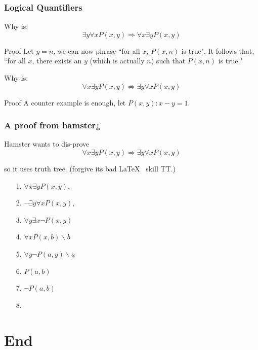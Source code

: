 \documentclass[xcolor=table]{beamer}
\begin{document}
\begin{frame}
    \frametitle{Logical Quantifiers}
    Why is:
    $$\exists y\forall xP(x, y) \Rightarrow  \forall x \exists yP(x, y)$$
    
    \begin{block}{Proof}
        Let $y=n$, we can now phrase ``for all $x$, $P(x,n)$ is true". It follows that, ``for all $x$, there exists an $y$ (which is actually $n$) such that $P(x,n)$ is true."
    \end{block}
    
    \vspace{1em}
    Why is:
    $$\forall x \exists y P(x, y) \not\Rightarrow  \exists y\forall x P(x, y)$$

    \begin{block}{Proof}
    A counter example is enough, let $P(x,y): x-y=1$. 
    \end{block}
\end{frame}
\begin{frame}
    \frametitle{A proof from hamster¿}
    Hamster wants to dis-prove $$\forall x \exists y P(x, y) \Rightarrow  \exists y\forall x P(x, y)$$

    so it uses truth tree. (forgive its bad \LaTeX~ skill TT.)
    \begin{itemize}
        \item[1.]$\forall x \exists y P(x, y)$, 
        \item[2.]$\neg \exists y\forall x P(x, y)$, 
        \item[3.]$\forall y \exists x \neg P(x,y)$ 
        \item[4.]$\forall x P(x,b) \backslash b$ 
        \item[5.]$\forall y \neg P(a,y) \backslash a$ 
        \item[6.]$P(a,b)$ 
        \item[7.]$\neg P(a,b)$ 
        \item[8.]
    \end{itemize}
\end{frame}
\section{End}
\end{document}
